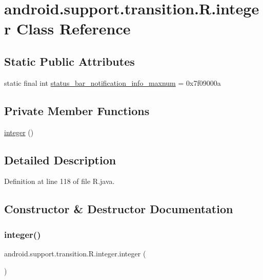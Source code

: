 \hypertarget{classandroid_1_1support_1_1transition_1_1_r_1_1integer}{}\section{android.\+support.\+transition.\+R.\+integer Class Reference}
\label{classandroid_1_1support_1_1transition_1_1_r_1_1integer}
\subsection*{Static Public Attributes}
\begin{DoxyCompactItemize}
\item 
static final int \mbox{\hyperlink{classandroid_1_1support_1_1transition_1_1_r_1_1integer_a16b7d2020f81686d87ad20ae20652f64}{status\+\_\+bar\+\_\+notification\+\_\+info\+\_\+maxnum}} = 0x7f09000a
\end{DoxyCompactItemize}
\subsection*{Private Member Functions}
\begin{DoxyCompactItemize}
\item 
\mbox{\hyperlink{classandroid_1_1support_1_1transition_1_1_r_1_1integer_ac4c90ce8c89a6d2f260f1d7b119c6feb}{integer}} ()
\end{DoxyCompactItemize}


\subsection{Detailed Description}


Definition at line 118 of file R.\+java.



\subsection{Constructor \& Destructor Documentation}
\mbox{\label{classandroid_1_1support_1_1transition_1_1_r_1_1integer_ac4c90ce8c89a6d2f260f1d7b119c6feb}} 
\subsubsection{\texorpdfstring{integer()}{integer()}}
{\footnotesize\ttfamily android.\+support.\+transition.\+R.\+integer.\+integer (\begin{DoxyParamCaption}{ }\end{DoxyParamCaption})\hspace{0.3cm}{\ttfamily [private]}}



